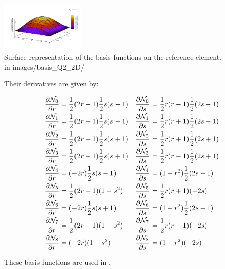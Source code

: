 \begin{center}
\includegraphics[width=4cm]{images/basis_Q2_2D/N9}\\
{\captionfont Surface representation of the basis functions on the reference element.\\
{\color{gray} in images/basis\_Q2\_2D/ }}
\end{center}


Their derivatives are given by:
\begin{mdframed}[backgroundcolor=blue!5]
\begin{align}
\frac{\partial {\mathcal{N}}_0}{\partial r}&= \frac{1}{2}(2r-1)  \frac{1}{2}s(s-1) & 
\frac{\partial {\mathcal{N}}_0}{\partial s}&= \frac{1}{2}r(r-1)  \frac{1}{2}(2s-1)\nonumber\\
\frac{\partial {\mathcal{N}}_1}{\partial r}&= \frac{1}{2}(2r+1)  \frac{1}{2}s(s-1) &
\frac{\partial {\mathcal{N}}_1}{\partial s}&= \frac{1}{2}r(r+1)  \frac{1}{2}(2s-1)\nonumber\\
\frac{\partial {\mathcal{N}}_2}{\partial r}&= \frac{1}{2}(2r+1)  \frac{1}{2}s(s+1) &
\frac{\partial {\mathcal{N}}_2}{\partial s}&= \frac{1}{2}r(r+1)  \frac{1}{2}(2s+1)\nonumber\\
\frac{\partial {\mathcal{N}}_3}{\partial r}&= \frac{1}{2}(2r-1)  \frac{1}{2}s(s+1) &
\frac{\partial {\mathcal{N}}_3}{\partial s}&= \frac{1}{2}r(r-1)  \frac{1}{2}(2s+1)\nonumber\\
\frac{\partial {\mathcal{N}}_4}{\partial r}&=       (-2r)  \frac{1}{2}s(s-1) &
\frac{\partial {\mathcal{N}}_4}{\partial s}&=     (1-r^2)  \frac{1}{2}(2s-1)\nonumber\\
\frac{\partial {\mathcal{N}}_5}{\partial r}&= \frac{1}{2}(2r+1)     (1-s^2)&
\frac{\partial {\mathcal{N}}_5}{\partial s}&= \frac{1}{2}r(r+1)        (-2s)\nonumber\\
\frac{\partial {\mathcal{N}}_6}{\partial r}&=       (-2r)  \frac{1}{2}s(s+1)&
\frac{\partial {\mathcal{N}}_6}{\partial s}&=     (1-r^2)  \frac{1}{2}(2s+1)\nonumber\\
\frac{\partial {\mathcal{N}}_7}{\partial r}&= \frac{1}{2}(2r-1)     (1-s^2)&
\frac{\partial {\mathcal{N}}_7}{\partial s}&= \frac{1}{2}r(r-1)        (-2s)\nonumber\\
\frac{\partial {\mathcal{N}}_8}{\partial r}&=       (-2r)     (1-s^2)&
\frac{\partial {\mathcal{N}}_8}{\partial s}&=     (1-r^2)        (-2s)\nonumber
\end{align}
\end{mdframed}

These basis functions are used in .
